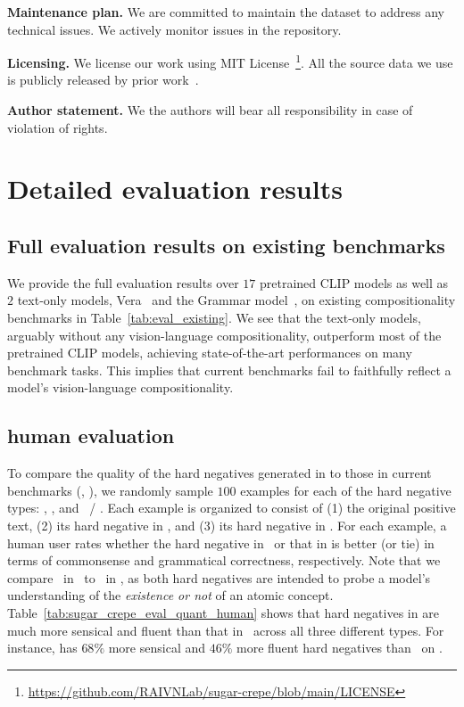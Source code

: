 \textbf{Maintenance plan.}
We are committed to maintain the dataset to address any technical issues. We actively monitor issues in the repository.



\textbf{Licensing.}
We license our work using MIT License~\footnote{\url{https://github.com/RAIVNLab/sugar-crepe/blob/main/LICENSE}}.
All the source data we use is publicly released by prior work~\cite{lin2014microsoft}.



\textbf{Author statement.}
We the authors will bear all responsibility in case of violation of rights.


\section{Detailed evaluation results}

\subsection{Full evaluation results on existing benchmarks}
\label{app:eval}

We provide the full evaluation results over $17$ pretrained CLIP models as well as $2$ text-only models, Vera~\cite{liu2023vera} and the Grammar model~\cite{morris2020textattack}, on existing compositionality benchmarks in Table~\ref{tab:eval_existing}. We see that the text-only models, arguably without any vision-language compositionality, outperform most of the pretrained CLIP models, achieving state-of-the-art performances on many benchmark tasks. This implies that current benchmarks fail to faithfully reflect a model's vision-language compositionality.



\subsection{\method human evaluation}
\label{app:sugar}
To compare the quality of the hard negatives generated in \method to those in current benchmarks (\ie, \hncoco), we randomly sample $100$ examples for each of the hard negative types: \replace, \swap, and \negate\ / \add.
Each example is organized to consist of (1) the original positive text, (2) its hard negative in \hncoco, and (3) its hard negative in \method. For each example, a human user rates whether the hard negative in \hncoco\ or that in \method is better (or tie) in terms of commonsense and grammatical correctness, respectively. Note that we compare \negate\ in \hncoco\ to \add\ in \method, as both hard negatives are intended to probe a model's understanding of the \textit{existence or not} of an atomic concept. Table~\ref{tab:sugar_crepe_eval_quant_human} shows that hard negatives in \method are much more sensical and fluent than that in \hncoco\ across all three different types. For instance, \method has $68\%$ more sensical and $46\%$ more fluent hard negatives than \hncoco\ on \swap.

